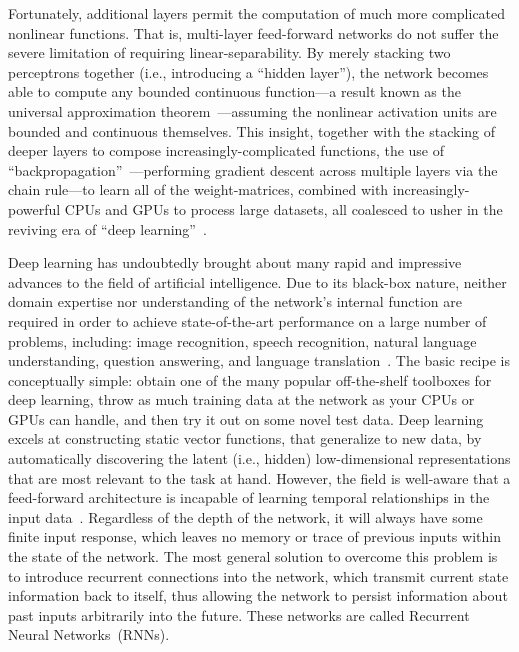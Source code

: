 Fortunately, additional layers permit the computation of much more complicated nonlinear functions.
That is, multi-layer feed-forward networks do not suffer the severe limitation of requiring linear-separability.
By merely stacking two perceptrons together (i.e., introducing a ``hidden layer''), the network becomes able to compute any bounded continuous function---a result known as the universal approximation theorem~\citep{hornik1989multilayer}---assuming the nonlinear activation units are bounded and continuous themselves.
This insight, together with the stacking of deeper layers to compose increasingly-complicated functions, the use of ``backpropagation''~\citep{werbos1974beyond, rumelhart1986learning}---performing gradient descent across multiple layers via the chain rule---to learn all of the weight-matrices, combined with increasingly-powerful CPUs and GPUs to process large datasets, all coalesced to usher in the reviving era of ``deep learning''~\citep{sejnowski2018deep}.

Deep learning has undoubtedly brought about many rapid and impressive advances to the field of artificial intelligence.
Due to its black-box nature, neither domain expertise nor understanding of the network's internal function are required in order to achieve state-of-the-art performance on a large number of problems, including: image recognition, speech recognition, natural language understanding, question answering, and language translation~\citep{lecun2015deep}.
The basic recipe is conceptually simple: obtain one of the many popular off-the-shelf toolboxes for deep learning, throw as much training data at the network as your CPUs or GPUs can handle, and then try it out on some novel test data.
Deep learning excels at constructing static vector functions, that generalize to new data, by automatically discovering the latent (i.e., hidden) low-dimensional representations that are most relevant to the task at hand.
However, the field is well-aware that a feed-forward architecture is incapable of learning temporal relationships in the input data~\citep{bengio1994learning}.
Regardless of the depth of the network, it will always have some finite input response, which leaves no memory or trace of previous inputs within the state of the network.
The most general solution to overcome this problem is to introduce recurrent connections into the network, which transmit current state information back to itself, thus allowing the network to persist information about past inputs arbitrarily into the future. 
These networks are called Recurrent Neural Networks~(RNNs).

